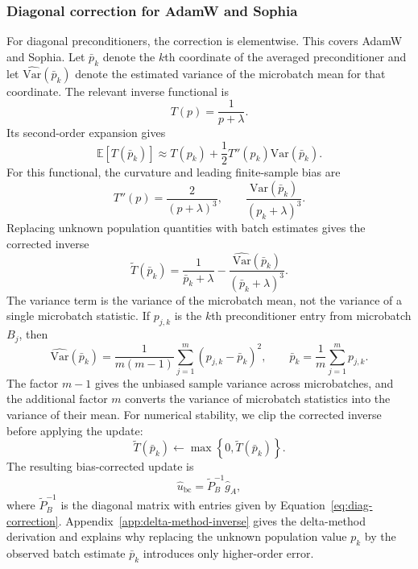 \documentclass{article}
\newcommand{\E}{\mathbb{E}}
\newcommand{\Var}{\mathrm{Var}}
\begin{document}
\subsubsection{Diagonal correction for AdamW and Sophia}

For diagonal preconditioners, the correction is elementwise. This covers AdamW and Sophia. Let $\bar p_k$ denote the $k$th coordinate of the averaged preconditioner and let $\widehat{\Var}(\bar p_k)$ denote the estimated variance of the microbatch mean for that coordinate. The relevant inverse functional is
\begin{equation}
    T(p) = \frac{1}{p+\lambda}.
\end{equation}
Its second-order expansion gives
\begin{equation}
    \E[T(\bar p_k)]
    \approx
    T(p_k)
    +
    \frac{1}{2}T''(p_k)\Var(\bar p_k).
\end{equation}
For this functional, the curvature and leading finite-sample bias are
\begin{equation}
    T''(p) = \frac{2}{(p+\lambda)^3},
    \qquad
    \frac{\Var(\bar p_k)}{(p_k+\lambda)^3}.
\end{equation}
Replacing unknown population quantities with batch estimates gives the corrected inverse
\begin{equation}
    \widetilde T(\bar p_k)
    =
    \frac{1}{\bar p_k+\lambda}
    -
    \frac{\widehat{\Var}(\bar p_k)}{(\bar p_k+\lambda)^3}.
    \label{eq:diag-correction}
\end{equation}
The variance term is the variance of the microbatch mean, not the variance of a single microbatch statistic. If $p_{j,k}$ is the $k$th preconditioner entry from microbatch $B_j$, then
\begin{equation}
    \widehat{\Var}(\bar p_k)
    =
    \frac{1}{m(m-1)}
    \sum_{j=1}^m (p_{j,k}-\bar p_k)^2,
    \qquad
    \bar p_k=\frac{1}{m}\sum_{j=1}^m p_{j,k}.
    \label{eq:variance-of-mean-estimator}
\end{equation}
The factor $m-1$ gives the unbiased sample variance across microbatches, and the additional factor $m$ converts the variance of microbatch statistics into the variance of their mean. For numerical stability, we clip the corrected inverse before applying the update:
\begin{equation}
    \widetilde T(\bar p_k)
    \leftarrow
    \max\left\{0, \widetilde T(\bar p_k)\right\}.
\end{equation}
The resulting bias-corrected update is
\begin{equation}
    \hat u_{\mathrm{bc}}
    =
    \widetilde P_B^{-1}\hat g_A,
    \label{eq:bias-corrected-update}
\end{equation}
where $\widetilde P_B^{-1}$ is the diagonal matrix with entries given by Equation~\eqref{eq:diag-correction}. Appendix~\ref{app:delta-method-inverse} gives the delta-method derivation and explains why replacing the unknown population value $p_k$ by the observed batch estimate $\bar p_k$ introduces only higher-order error.
\end{document}
